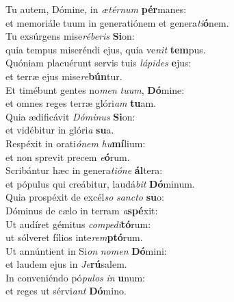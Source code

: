 \oddverse Tu autem, Dómine, in \textit{æ}\textit{tér}\textit{num} \textbf{pér}manes:~\*\\
\oddverse et memoriále tuum in generatiónem et genera\textit{ti}\textbf{ó}nem.\\
\evenverse Tu exsúrgens mise\textit{ré}\textit{be}\textit{ris} \textbf{Si}on:~\*\\
\evenverse quia tempus miseréndi ejus, quia ve\textit{nit} \textbf{tem}pus.\\
\oddverse Quóniam placuérunt servis tuis \textit{lá}\textit{pi}\textit{des} \textbf{e}jus:~\*\\
\oddverse et terræ ejus mise\textit{re}\textbf{bún}tur.\\
\evenverse Et timébunt gentes no\textit{men} \textit{tu}\textit{um}, \textbf{Dó}mine:~\*\\
\evenverse et omnes reges terræ glóri\textit{am} \textbf{tu}am.\\
\oddverse Quia ædificávit \textit{Dó}\textit{mi}\textit{nus} \textbf{Si}on:~\*\\
\oddverse et vidébitur in glóri\textit{a} \textbf{su}a.\\
\evenverse Respéxit in orati\textit{ó}\textit{nem} \textit{hu}\textbf{mí}lium:~\*\\
\evenverse et non sprevit precem \textit{e}\textbf{ó}rum.\\
\oddverse Scribántur hæc in genera\textit{ti}\textit{ó}\textit{ne} \textbf{ál}tera:~\*\\
\oddverse et pópulus qui creábitur, laudá\textit{bit} \textbf{Dó}minum.\\
\evenverse Quia prospéxit de excél\textit{so} \textit{san}\textit{cto} \textbf{su}o:~\*\\
\evenverse Dóminus de cælo in terram \textit{a}\textbf{spé}xit:\\
\oddverse Ut audíret gémitus \textit{com}\textit{pe}\textit{di}\textbf{tó}rum:~\*\\
\oddverse ut sólveret fílios inte\textit{rem}\textbf{ptó}rum.\\
\evenverse Ut annúntient in Si\textit{on} \textit{no}\textit{men} \textbf{Dó}mini:~\*\\
\evenverse et laudem ejus in \textit{Je}\textbf{rú}salem.\\
\oddverse In conveniéndo pó\textit{pu}\textit{los} \textit{in} \textbf{u}num:~\*\\
\oddverse et reges ut sérvi\textit{ant} \textbf{Dó}mino.\\
